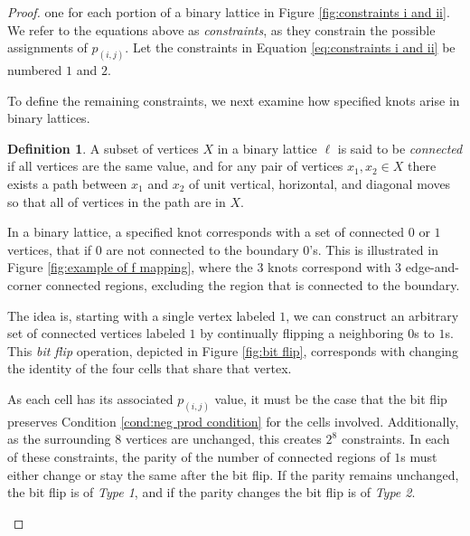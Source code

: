 \documentclass[12pt]{article}
\theoremstyle{plain}
\theoremstyle{definition}
\newtheorem{definition}{Definition}[section]
\theoremstyle{remark}
\theoremstyle{definition}
\begin{document}
\begin{proof}
one for each portion of a binary lattice in Figure \ref{fig:constraints i and ii}. We refer to the equations above as \textit{constraints}, as they constrain the possible assignments of $p_{(i,j)}$. Let the constraints in Equation \ref{eq:constraints i and ii} be numbered $1$ and $2$.

To define the remaining constraints, we next examine how specified knots arise in binary lattices.

\begin{definition}
    A subset of vertices $X$ in a binary lattice $\ell$ is said to be \textit{connected} if all vertices are the same value, and for any pair of vertices $x_1, x_2 \in X$ there exists a path between $x_1$ and $x_2$ of unit vertical, horizontal, and diagonal moves so that all of vertices in the path are in $X$. 
\end{definition}

In a binary lattice, a specified knot corresponds with a set of connected $0$ or $1$ vertices, that if $0$ are not connected to the boundary $0$'s. This is illustrated in Figure \ref{fig:example of f mapping}, where the $3$ knots correspond with $3$ edge-and-corner connected regions, excluding the region that is connected to the boundary. 

The idea is, starting with a single vertex labeled $1$, we can construct an arbitrary set of connected vertices labeled $1$ by continually flipping a neighboring $0$s to $1$s. This \textit{bit flip} operation, depicted in Figure \ref{fig:bit flip}, corresponds with changing the identity of the four cells that share that vertex.

As each cell has its associated $p_{(i,j)}$ value, it must be the case that the bit flip preserves Condition \ref{cond:neg prod condition} for the cells involved. Additionally, as the surrounding $8$ vertices are unchanged, this creates $2^8$ constraints. In each of these constraints, the parity of the number of connected regions of $1$s must either change or stay the same after the bit flip. If the parity remains unchanged, the bit flip is of \textit{Type 1}, and if the parity changes the bit flip is of \textit{Type 2}.

\begin{figure}[h!]
    \begin{center}


\end{center}
\end{figure}
\end{proof}
\end{document}
